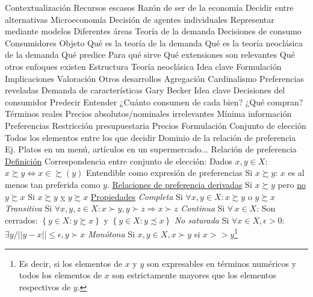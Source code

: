 \documentclass{nuevotema}
\begin{document}
\begin{esquemal}
	\1[] 
		\2 Contextualización
			\3 Recursos escasos
				\4 Razón de ser de la economía
				\4 Decidir entre alternativas
			\3 Microeconomía
				\4 Decisión de agentes individuales
				\4 Representar mediante modelos
				\4 Diferentes áreas
			\3 Teoría de la demanda
				\4 Decisiones de consumo
				\4 Consumidores
		\2 Objeto
			\3 Qué es la teoría de la demanda
			\3 Qué es la teoría neoclásica de la demanda
			\3 Qué predice
			\3 Para qué sirve
			\3 Qué extensiones son relevantes
			\3 Qué otros enfoques existen
		\2 Estructura
			\3 Teoría neoclásica
				\4 Idea clave
				\4 Formulación
				\4 Implicaciones
				\4 Valoración
			\3 Otros desarrollos
				\4 Agregación
				\4 Cardinalismo
				\4 Preferencias reveladas
				\4 Demanda de características
				\4 Gary Becker
	\1 
		\2 Idea clave
			\3 Decisiones del consumidor
				\4 Predecir
				\4 Entender
				\4 ¿Cuánto consumen de cada bien?
				\4 ¿Qué compran?
			\3 Términos reales
				\4 Precios absolutos/nominales irrelevantes
			\3 Mínima información
				\4 Preferencias
				\4 Restricción presupuestaria
				\4 Precios
		\2 Formulación
			\3 Conjunto de elección
				\4 Todos los elementos entre los que decidir
				\4 Dominio de la relación de preferencia
				\4 Ej. Platos en un menú, artículos en un supermercado...
			\3 Relación de preferencia
				\4 \underline{Definición}
				\4 Correspondencia entre conjunto de elección:
				\4[] Dados $x,y \in X$: $x \succsim y \iff x \in \succsim \left (y \right)$
				\4 Entendible como expresión de preferencias
				\4[] Si $x\succsim y$: $x$ es al menos tan preferida como $y$.
				\4 \underline{Relaciones de preferencia derivadas}
				\4[$\succ$] Si $x \succsim y$ pero \underline{no} $y \succsim x$
				\4[$\sim$] Si $x \succsim y$ \underline{y} $y \succsim x$
				\4 \underline{Propiedades}
				\4[(i)] \textit{Completa}
				\4[] Si $\forall x, y \in X: x \succsim y$ o $y \succsim x$
				\4[(ii)] \textit{Transitiva}
				\4[] Si $\forall x, y, z \in X: x \succ y, y \succ z \Rightarrow x \succ z$
				\4[(iii)] \textit{Continua}
				\4[] Si $\forall \, x \in X$:
				\4[] Son cerrados: $\left\lbrace y \in X: y \succsim x \right\rbrace $ y $\left\lbrace y \in X: y \precsim x \right\rbrace $
				\4[(iv)] \textit{No saturada}
				\4[] Si $\forall x \in X, \epsilon > 0:$
				\4[] $\exists y / ||y - x|| \leq \epsilon, y \succ x$
				\4[(v)] \textit{Monótona}
				\4[] Si $x,y \in X, x \succ y$ si $x >> y$\footnote{Es decir, si los elementos de $x$ y $y$ son expresables en términos numéricos y todos los elementos de $x$ son estrictamente mayores que los elementos respectivos de $y$.}

\end{esquemal}
\end{document}
